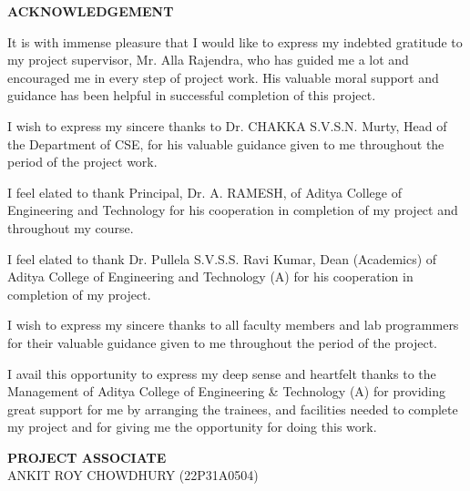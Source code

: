 \begin{center}
{\bfseries\fontsize{16}{18}\selectfont ACKNOWLEDGEMENT}
\end{center}

\vspace{0.5cm}
\noindent
It is with immense pleasure that I would like to express my indebted gratitude to my project supervisor,
Mr. Alla Rajendra, who has guided me a lot and encouraged me in every step of project work.
His valuable moral support and guidance has been helpful in successful completion of this project.

\vspace{0.3cm}

\noindent
I wish to express my sincere thanks to Dr. CHAKKA S.V.S.N. Murty, Head of the Department of CSE,
for his valuable guidance given to me throughout the period of the project work.

\vspace{0.3cm}

\noindent
I feel elated to thank Principal, Dr. A. RAMESH, of Aditya College of Engineering and Technology
for his cooperation in completion of my project and throughout my course.

\vspace{0.3cm}

\noindent
I feel elated to thank Dr. Pullela S.V.S.S. Ravi Kumar, Dean (Academics) of Aditya College of Engineering and Technology (A)
for his cooperation in completion of my project.

\vspace{0.3cm}

\noindent
I wish to express my sincere thanks to all faculty members and lab programmers for their valuable guidance
given to me throughout the period of the project.

\vspace{0.3cm}

\noindent
I avail this opportunity to express my deep sense and heartfelt thanks to the Management of
Aditya College of Engineering \& Technology (A) for providing great support for me by arranging the trainees,
and facilities needed to complete my project and for giving me the opportunity for doing this work.

\vspace{2cm}

\begin{flushright}
\textbf{PROJECT ASSOCIATE}\\[0.5cm]

ANKIT ROY CHOWDHURY (22P31A0504)
\end{flushright}